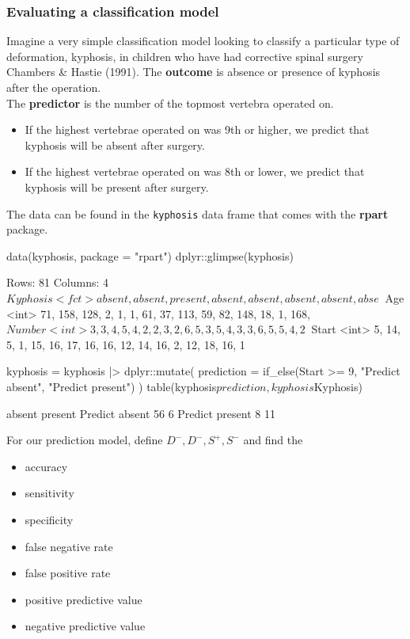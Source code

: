 \documentclass[a4paper]{article}
\begin{document}
\subsubsection{Evaluating a classification model}
Imagine a very simple classification model looking to classify a particular type of deformation, kyphosis, in children who have had corrective spinal surgery Chambers \& Hastie (1991).
The \textbf{outcome} is absence or presence of kyphosis after the operation.\\
The \textbf{predictor} is the number of the topmost vertebra operated on.
\begin{itemize}
	\item If the highest vertebrae operated on was 9th or higher, we predict that kyphosis will be absent after surgery.
	\item If the highest vertebrae operated on was 8th or lower, we predict that kyphosis will be present after surgery.
\end{itemize}
The data can be found in the \lstinline|kyphosis| data frame that comes with the \textbf{rpart} package.
\begin{Schunk}
\begin{Sinput}
data(kyphosis, package = "rpart")
dplyr::glimpse(kyphosis)
\end{Sinput}
\begin{Soutput}
Rows: 81
Columns: 4
$ Kyphosis <fct> absent, absent, present, absent, absent, absent, absent, abse~
$ Age      <int> 71, 158, 128, 2, 1, 1, 61, 37, 113, 59, 82, 148, 18, 1, 168, ~
$ Number   <int> 3, 3, 4, 5, 4, 2, 2, 3, 2, 6, 5, 3, 5, 4, 3, 3, 6, 5, 5, 4, 2~
$ Start    <int> 5, 14, 5, 1, 15, 16, 17, 16, 16, 12, 14, 16, 2, 12, 18, 16, 1~
\end{Soutput}
\begin{Sinput}
kyphosis = kyphosis |> 
  dplyr::mutate(
    prediction = if_else(Start >= 9, 
                         "Predict absent", 
                         "Predict present")
  )
table(kyphosis$prediction, kyphosis$Kyphosis)
\end{Sinput}
\begin{Soutput}
                 
                  absent present
  Predict absent      56       6
  Predict present      8      11
\end{Soutput}
\end{Schunk}
For our prediction model, define \( D^-, D^-, S^+, S^- \) and find the
\begin{itemize}
	\item accuracy
	\item sensitivity
	\item specificity
	\item false negative rate
	\item false positive rate
	\item positive predictive value
	\item negative predictive value
\end{itemize}
\end{document}
